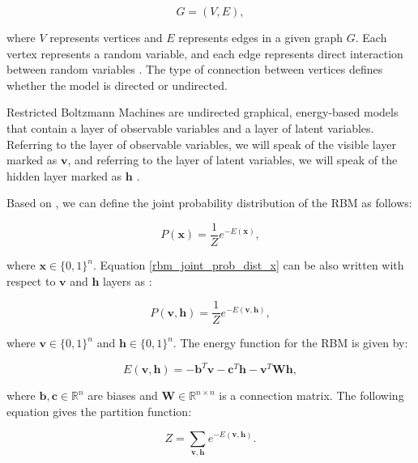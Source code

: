 \documentclass[a4paper,12pt]{article}
\begin{document}
\begin{equation}
    G=(V,E),
\end{equation}

\noindent where $V$ represents vertices and $E$ represents edges in a given graph $G$. Each vertex represents a random variable, and each edge represents direct interaction between random variables \cite{Goodfellow2016}. The type of connection between vertices defines whether the model is directed or undirected.

Restricted Boltzmann Machines are undirected graphical, energy-based models that contain a layer of observable variables and a layer of latent variables. Referring to the layer of observable variables, we will speak of the visible layer marked as $\mathbf{v}$, and referring to the layer of latent variables, we will speak of the hidden layer marked as $\mathbf{h}$ \cite{Goodfellow2016, Tieleman2008}.

Based on \cite{Goodfellow2016, Dixit2021RBM_DWave}, we can define the joint probability distribution of the RBM as follows:

\begin{equation}\label{rbm_joint_prob_dist_x}
    P(\mathbf{x}) = \frac{1}{Z} e^{-E(\mathbf{x})},
\end{equation}

\noindent where $\mathbf{x} \in \{0,1\}^n$. Equation \eqref{rbm_joint_prob_dist_x} can be also written with respect to $\mathbf{v}$ and $\mathbf{h}$ layers as \cite{Goodfellow2016}:

\begin{equation}\label{rbm_joint_prob_dist}
    P(\mathbf{v}, \mathbf{h}) = \frac{1}{Z} e^{-E(\mathbf{v}, \mathbf{h})},
\end{equation}

\noindent where $\mathbf{v} \in \{0,1\}^n$ and $\mathbf{h} \in \{0,1\}^n$. The energy function for the RBM is given by:

\begin{equation}\label{rbm_energy_function}
    E(\mathbf{v},\mathbf{h})=-\mathbf{b}^T\mathbf{v}-\mathbf{c}^T\mathbf{h}-\mathbf{v}^T\mathit{\mathbf{W}\mathbf{h}},
\end{equation}

\noindent where $\mathbf{b},\mathbf{c} \in \mathbb{R}^n$ are biases and  $\mathbf{W} \in \mathbb{R}^{n \times n}$ is a connection matrix. The following equation gives the partition function:

\begin{equation}\label{rbm_partition_function}
    Z = \sum_{\mathbf{v},\mathbf{h}} e^{-E(\mathbf{v},\mathbf{h})}.
\end{equation}
\end{document}
